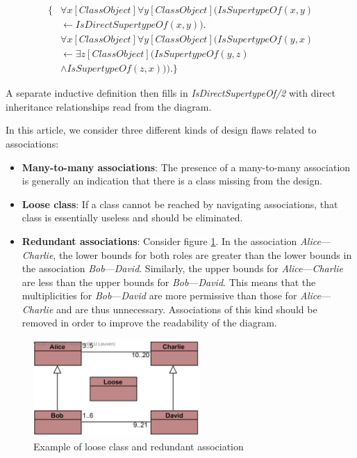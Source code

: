 \documentclass[conference]{IEEEtran}
\begin{document}
\begin{align*}
	\{ &\forall{x}[ClassObject]\forall{y}[ClassObject](IsSupertypeOf(x, y) \\ &\leftarrow IsDirectSupertypeOf(x, y)). \\
	&\forall{x}[ClassObject]\forall{y}[ClassObject](IsSupertypeOf(y, x) \\ &\leftarrow \exists{z}[ClassObject](IsSupertypeOf(y, z)  \\ &\land IsSupertypeOf(z, x))).\}
\end{align*}

A separate inductive definition then fills in \textit{IsDirectSupertypeOf/2} with direct inheritance relationships read from the diagram.

In this article, we consider three different kinds of design flaws related to associations:

\begin{itemize}
	\item \textbf{Many-to-many associations}: The presence of a many-to-many association is generally an indication that there is a class missing from the design.
	\item \textbf{Loose class}: If a class cannot be reached by navigating associations, that class is essentially useless and should be eliminated.
	\item \textbf{Redundant associations}\cite{Balaban2015}: Consider figure \ref{fig:design-flaw}. In the association \textit{Alice}---\textit{Charlie}, the lower bounds for both roles are greater than the lower bounds in the association \textit{Bob}---\textit{David}. Similarly, the upper bounds for \textit{Alice}---\textit{Charlie} are less than the upper bounds for \textit{Bob}---\textit{David}. This means that the multiplicities for \textit{Bob}---\textit{David} are more permissive than those for \textit{Alice}---\textit{Charlie} and are thus unnecessary. Associations of this kind should be removed in order to improve the readability of the diagram.
\end{itemize}

\begin{figure}[!t]
	\centering
	\includegraphics[width=2.5in]{hierarchy}
	\caption{Example of loose class and redundant association}
	\label{fig:design-flaw}
\end{figure}
\end{document}

